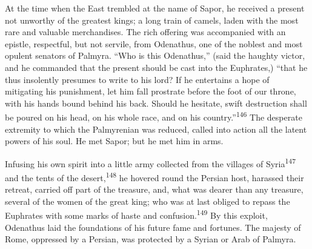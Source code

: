 




At the time when the East trembled at the name of Sapor, he
received a present not unworthy of the greatest kings; a long
train of camels, laden with the most rare and valuable
merchandises. The rich offering was accompanied with an epistle,
respectful, but not servile, from Odenathus, one of the noblest
and most opulent senators of Palmyra. “Who is this Odenathus,”
(said the haughty victor, and he commanded that the present
should be cast into the Euphrates,) “that he thus insolently
presumes to write to his lord? If he entertains a hope of
mitigating his punishment, let him fall prostrate before the foot
of our throne, with his hands bound behind his back. Should he
hesitate, swift destruction shall be poured on his head, on his
whole race, and on his country.”\textsuperscript{146} The desperate extremity to
which the Palmyrenian was reduced, called into action all the
latent powers of his soul. He met Sapor; but he met him in arms.

Infusing his own spirit into a little army collected from the
villages of Syria\textsuperscript{147} and the tents of the desert,\textsuperscript{148} he hovered
round the Persian host, harassed their retreat, carried off part
of the treasure, and, what was dearer than any treasure, several
of the women of the great king; who was at last obliged to repass
the Euphrates with some marks of haste and confusion.\textsuperscript{149} By this
exploit, Odenathus laid the foundations of his future fame and
fortunes. The majesty of Rome, oppressed by a Persian, was
protected by a Syrian or Arab of Palmyra.

